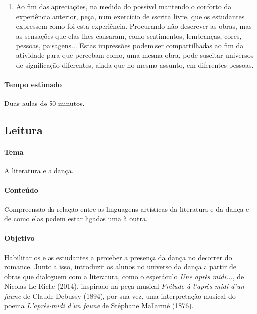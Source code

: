 \documentclass[12pt]{extarticle}
\begin{document}
\begin{enumerate}
  \item
  Ao fim das apreciações, na medida do possível mantendo o conforto
  da experiência anterior, peça, num exercício de escrita livre,
  que os estudantes expressem como foi esta experiência. Procurando
  não descrever as obras, mas as sensações que elas lhes causaram, 
  como sentimentos, lembranças, cores, pessoas, paisagens... 
  Estas impressões podem ser compartilhadas ao fim da atividade para 
  que percebam como, uma mesma obra, pode suscitar universos de
  significação diferentes, ainda que no mesmo assunto, em diferentes
  pessoas.

\end{enumerate}

\paragraph{Tempo estimado} Duas aulas de 50 minutos.


\subsection{Leitura}



\paragraph{Tema} A literatura e a dança.

\paragraph{Conteúdo} Compreensão da relação entre as linguagens artísticas
da literatura e da dança e de como elas podem estar ligadas uma à outra. 

\paragraph{Objetivo} Habilitar os e as estudantes a perceber a presença
da dança no decorrer do romance. Junto a isso, introduzir os alunos
no universo da dança a partir de obras que dialoguem com a literatura,
como o espetáculo \textit{Une après midi...}, de Nicolas Le Riche
(2014), inspirado na peça musical \textit{Prélude à l'après-midi
d'un faune} de Claude Debussy (1894), por sua
vez, uma interpretação musical do poema \textit{L'après-midi d'un faune} 
de Stéphane Mallarmé (1876).
\end{document}
